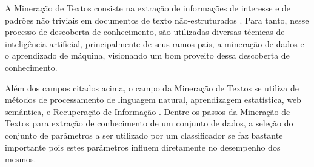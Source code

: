
A Mineração de Textos consiste na extração de informações de interesse e de padrões não triviais em documentos de texto não-estruturados \cite{Srivastava2009TMCCA}. 
Para tanto, nesse processo de descoberta de conhecimento, são utilizadas diversas técnicas de inteligência artificial, principalmente de seus ramos pais, a mineração de dados e o aprendizado de máquina, visionando um bom proveito dessa descoberta de conhecimento.

Além dos campos citados acima, o campo da Mineração de Textos se utiliza de métodos de processamento de linguagem natural, aprendizagem estatística, web semântica, e Recuperação de Informação \cite{Sammut2017EMLDM} \cite{Manning2008IIR}. 
Dentre os passos da Mineração de Textos para extração de conhecimento de um conjunto de dados, a seleção do conjunto de parâmetros a ser utilizado por um classificador se faz bastante importante pois estes parâmetros influem diretamente no desempenho dos mesmos.
